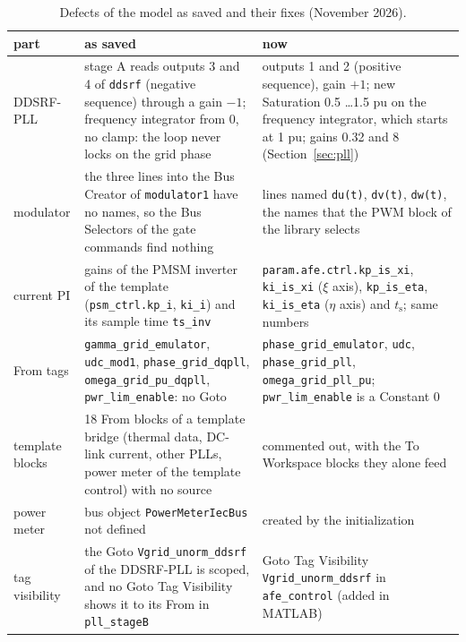\documentclass[11pt,a4paper]{scrartcl}
\newcommand{\ped}[1]{_{\mathrm{#1}}}
\newcommand{\code}[1]{\texttt{#1}}
\begin{document}
\begin{onehalfspace}
\begin{table}[H]
	\centering
	\caption{Defects of the model as saved and their fixes (November 2026).}
	\label{tab:fixes}
	\footnotesize
	\begin{tabularx}{\textwidth}{@{} >{\raggedright\arraybackslash}p{} X X @{}}
		\toprule
		part & as saved & now \\
		\midrule
		DDSRF-PLL & stage A reads outputs 3 and 4 of \code{ddsrf} (negative sequence) through a gain $-1$; frequency integrator from 0, no clamp: the loop never locks on the grid phase & outputs 1 and 2 (positive sequence), gain $+1$; new Saturation \num{0.5} \ldots \num{1.5} pu on the frequency integrator, which starts at \num{1} pu; gains \num{0.32} and \num{8} (Section~\ref{sec:pll}) \\
		modulator & the three lines into the Bus Creator of \code{modulator1} have no names, so the Bus Selectors of the gate commands find nothing & lines named \code{du(t)}, \code{dv(t)}, \code{dw(t)}, the names that the PWM block of the library selects \\
		current PI & gains of the PMSM inverter of the template (\code{psm\_ctrl.kp\_i}, \code{ki\_i}) and its sample time \code{ts\_inv} & \code{param.afe.ctrl.kp\_is\_xi}, \code{ki\_is\_xi} ($\xi$ axis), \code{kp\_is\_eta}, \code{ki\_is\_eta} ($\eta$ axis) and $t\ped{s}$; same numbers \\
		From tags & \code{gamma\_grid\_emulator}, \code{udc\_mod1}, \code{phase\_grid\_dqpll}, \code{omega\_grid\_pu\_dqpll}, \code{pwr\_lim\_enable}: no Goto & \code{phase\_grid\_emulator}, \code{udc}, \code{phase\_grid\_pll}, \code{omega\_grid\_pll\_pu}; \code{pwr\_lim\_enable} is a Constant 0 \\
		template blocks & 18 From blocks of a template bridge (thermal data, DC-link current, other PLLs, power meter of the template control) with no source & commented out, with the To Workspace blocks they alone feed \\
		power meter & bus object \code{PowerMeterIecBus} not defined & created by the initialization \\
		tag visibility & the Goto \code{Vgrid\_unorm\_ddsrf} of the DDSRF-PLL is scoped, and no Goto Tag Visibility shows it to its From in \code{pll\_stageB} & Goto Tag Visibility \code{Vgrid\_unorm\_ddsrf} in \code{afe\_control} (added in MATLAB) \\
		\bottomrule
	\end{tabularx}
\end{table}


\end{onehalfspace}
\end{document}
